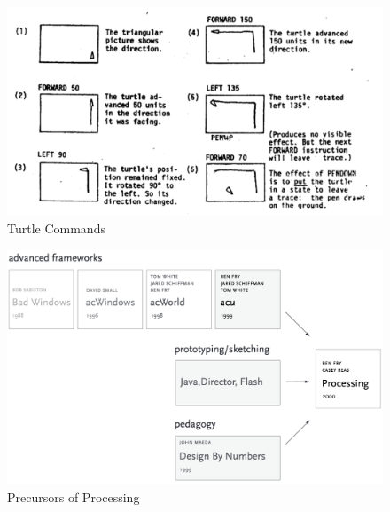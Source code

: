   \begin{figure}
    \includegraphics[max width=\textwidth]{images/turtle-commands.png} 
    \caption{Turtle Commands \parencite[827]{solomonHistoryLogo2020a}}
    \label{fig:turtle-commands}
  \end{figure}

\begin{figure}
    \includegraphics[max width=\textwidth]{images/fry2004-frameworks.png} 
    \caption{Precursors of Processing \parencite[127]{fryComputationalInformationDesign2004}}
    \label{fig:dbn}
  \end{figure}

